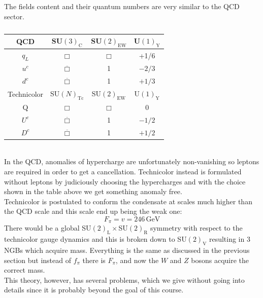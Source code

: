 \documentclass[../main.tex]{subfiles}
\begin{document}
The fields content and their quantum numbers are very similar to the QCD sector.
\begin{table}[h]
    \centering
    \begin{tabular}{c|ccc}
    \hline
    \rowcolor{blue!45} QCD & SU$(3)_{\text{C}}$ & SU$(2)_{\text{EW}}$ & U$(1)_{\text{Y}}$\\
    \hline 
    $q_L$ & $\Box$ & $\Box$ & +1/6\\
    $u^c$ & $\overline{\Box}$ & 1 & $-2/3$\\
    $d^c$ & $\overline{\Box}$ & 1 & $+1/3$\\
    \hline\hline
    \rowcolor{blue!45}Technicolor & SU$(N)_{\text{Tc}}$ & SU$(2)_{\text{EW}}$ & U$(1)_{\text{Y}}$\\
    \hline
    Q & $\Box$ & $\Box$ & 0\\
    $U^c$ & $\overline{\Box}$ & 1 & $-1/2$\\
    $D^c$ & $\overline{\Box}$ & 1 & $+1/2$\\
    \hline
    \end{tabular}
    \caption*{}
\end{table}\\
In the QCD, anomalies of hypercharge are unfortunately non-vanishing so leptons are required in order to get a cancellation. Technicolor instead is formulated without leptons by judiciously choosing the hypercharges and with the choice shown in the table above we get something anomaly free.\\ Technicolor is postulated to conform the condensate at scales much higher than the QCD scale and this scale end up being the weak one: 
\[
F_\pi=v=246\,\text{GeV}
\]
There would be a global SU$(2)_{\text{L}}\times$SU$(2)_{\text{R}}$ symmetry with respect to the technicolor gauge dynamics and this is broken down to SU$(2)_{\text{V}}$ resulting in 3 NGBs which acquire mass. Everything is the same as discussed in the previous section but instead of $f_\pi$ there is $F_\pi$, and now the $W$ and $Z$ bosons acquire the correct mass.\\
This theory, however, has several problems, which we give without going into details since it is probably beyond the goal of this course.
\end{document}
